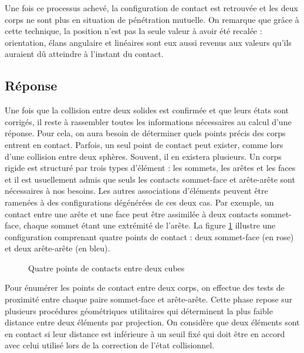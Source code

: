 Une fois ce processus achevé, la configuration de contact est
retrouvée et les deux corps ne sont plus en situation de pénétration
mutuelle. On remarque que grâce à cette technique, la position n'est
pas la seule valeur à avoir été recalée : orientation, élans angulaire
et linéaires sont eux aussi revenus aux valeurs qu'ils auraient dû
atteindre à l'instant du contact.

\subsection{Réponse}

Une fois que la collision entre deux solides est confirmée et que
leurs états sont corrigés, il reste à rassembler toutes les
informations nécessaires au calcul d'une réponse. Pour cela, on aura
besoin de déterminer quels points précis des corps entrent en contact.
Parfois, un seul point de contact peut exister, comme lors d'une
collision entre deux sphères. Souvent, il en existera plusieurs. Un
corps rigide est structuré par trois types d'élément : les sommets,
les arêtes et les faces et il est usuellement admis que seuls les
contacts sommet-face et arête-arête sont nécessaires à nos
besoins. Les autres associations d'éléments peuvent être ramenées à
des configurations dégénérées de ces deux cas. Par exemple, un contact
entre une arête et une face peut être assimilée à deux contacts
sommet-face, chaque sommet étant une extrémité de l'arête. La figure
\ref{contacts} illustre une configuration comprenant quatre points de
contact : deux sommet-face (en rose) et deux arête-arête (en bleu).

\begin{figure}
  \centering
  \subfloat{
    
    
  }
  \caption{Quatre points de contacts entre deux cubes}
  \label{contacts}
\end{figure}

Pour énumérer les points de contact entre deux corps, on effectue des
tests de proximité entre chaque paire sommet-face et
arête-arête. Cette phase repose sur plusieurs procédures géométriques
utilitaires qui déterminent la plus faible distance entre deux
éléments par projection. On considère que deux éléments sont en
contact si leur distance est inférieure à un seuil fixé qui doit être
en accord avec celui utilisé lors de la correction de l'état
collisionnel.

